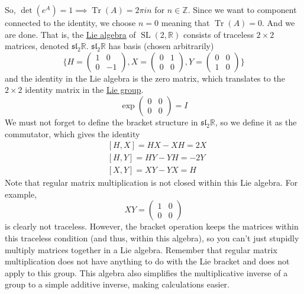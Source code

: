 \documentclass{article}
\DeclareMathOperator{\Tr}{Tr}
\DeclareMathOperator{\SL}{SL}
\newcounter{example}[section]
\begin{document}
    So, $\det{(e^A)} = 1 \implies \Tr{(A)} = 2 \pi i n$ for $n \in \mathbb{Z}$. Since we want to component connected to the identity, we choose $n=0$ meaning that $\Tr{(A)} = 0$. And we are done. That is, the \hyperref[def:lie-algebra]{Lie algebra} of $\SL(2, \mathbb{R})$ consists of traceless $2 \times 2$ matrices, denoted $\mathfrak{sl}_2 \mathbb{R}$. $\mathfrak{sl}_2 \mathbb{R}$ has basis (chosen arbitrarily) 
    \begin{equation}
      \bigg\{ H = \begin{pmatrix}
      1&0\\0&-1
      \end{pmatrix}, X = \begin{pmatrix}
      0&1\\0&0
      \end{pmatrix}, Y = \begin{pmatrix}
      0&0\\1&0
      \end{pmatrix}\bigg\}
    \end{equation}
    and the identity in the Lie algebra is the zero matrix, which translates to the $2 \times 2$ identity matrix in the \hyperref[def:lie-group]{Lie group}. 
    \begin{equation}
      \exp \begin{pmatrix}
      0&0\\0&0
      \end{pmatrix} = I
    \end{equation}
    We must not forget to define the bracket structure in $\mathfrak{sl}_2 \mathbb{R}$, so we define it as the commutator, which gives the identity
    \begin{align*}
      & [H,X] = HX - XH = 2X \\
      & [H,Y] = HY - YH = -2Y \\
      & [X,Y] = XY - YX = H
    \end{align*}
    Note that regular matrix multiplication is not closed within this Lie algebra. For example, 
    \begin{equation}
      X Y = \begin{pmatrix}
      1&0\\0&0
      \end{pmatrix}
    \end{equation}
    is clearly not traceless. However, the bracket operation keeps the matrices within this traceless condition (and thus, within this algebra), so you can't just stupidly multiply matrices together in a Lie algebra. Remember that regular matrix multiplication does not have anything to do with the Lie bracket and does not apply to this group. This algebra also simplifies the multiplicative inverse of a group to a simple additive inverse, making calculations easier. 
\end{document}

